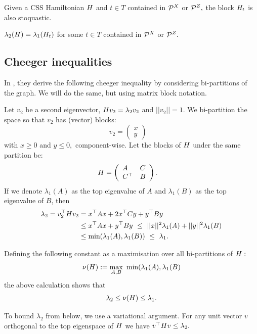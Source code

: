 \documentclass[12pt]{article}
\renewenvironment{framed}[1][\hsize]{%
\def\FrameCommand{{\color{black}\vrule width 3pt}\hspace{0pt}\fboxsep=\FrameSep\colorbox{lightgray}}%
\MakeFramed{\hsize0.8\linewidth\advance\hsize-\width\FrameRestore}}
{\endMakeFramed}
\begin{document}
\begin{framed}

Given a CSS Hamiltonian $H$ and
$t\in T$ contained in $\mathcal{P}^X$ or $\mathcal{P}^Z,$
the block $H_t$ is also stoquastic.
\end{framed}

\begin{framed}

$\lambda_2(H) = \lambda_1(H_t)$ for some
$t\in T$ contained in $\mathcal{P}^X$ or $\mathcal{P}^Z.$
\end{framed}

\subsection{Cheeger inequalities}

In \cite{Friedland2002}, they derive the following cheeger inequality
by considering bi-partitions of the graph. We will do the
same, but using matrix block notation.

Let $v_2$ be a second eigenvector, $ H v_2 = \lambda_2 v_2 $ 
and $||v_2||=1$.
We bi-partition the space 
so that $v_2$ has (vector) blocks:
$$
v_2 = \left( \begin{array}{l}
x\\
y\end{array} \right)\quad
$$
with $x\ge 0$ and $y\le 0,$ component-wise.
Let the blocks of $H$ under the same partition be:
$$
H = \left( \begin{array}{ll}
A&C\\
C^\top&B\end{array} \right).\quad
$$
If we denote $\lambda_1(A)$ as the top eigenvalue of $A$ and
$\lambda_1(B)$ as the top eigenvalue of $B$,
then
\begin{align*}
\lambda_2 = v_2^\top H v_2 &= x^\top A x + 2 x^\top C y + y^\top B y \\
        &\le x^\top A x + y^\top B y\ \le\ ||x||^2 \lambda_1(A) + ||y||^2 \lambda_1(B) \\
        &\le \mbox{min}(\lambda_1(A), \lambda_1(B))\ \le\ \lambda_1.
\end{align*}

Defining the following constant as a maximisation over
all bi-partitions of $H:$
$$
    \nu(\Ham) := \max_{A, B}\ \mbox{min}(\lambda_1(A), \lambda_1(B)
$$
the above calculation shows that
$$
    \lambda_2 \le \nu(H) \le \lambda_1.
$$

To bound $\lambda_2$ from below, we use a variational argument.
For any unit vector $v$ orthogonal to the top eigenspace of $H$ we
have $v^\top H v \le \lambda_2.$
\end{document}
